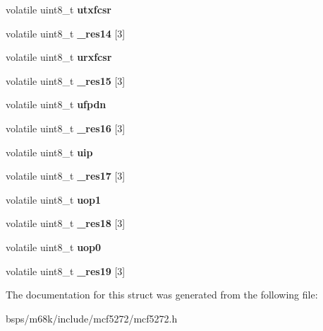 \begin{DoxyCompactItemize}
\item 
\mbox{\label{structuart__regs__t_a2d2aef760cfd8841151ebfd427f05e12}} 
volatile uint8\+\_\+t {\bfseries utxfcsr}
\item 
\mbox{\label{structuart__regs__t_a8f1a6281292c8860c2d577bcb0102aa6}} 
volatile uint8\+\_\+t {\bfseries \+\_\+res14} \mbox{[}3\mbox{]}
\item 
\mbox{\label{structuart__regs__t_a78f94dce8c79c4a4226facbc9e397433}} 
volatile uint8\+\_\+t {\bfseries urxfcsr}
\item 
\mbox{\label{structuart__regs__t_a585cb5a43e2e186bd1210509dd692c11}} 
volatile uint8\+\_\+t {\bfseries \+\_\+res15} \mbox{[}3\mbox{]}
\item 
\mbox{\label{structuart__regs__t_ac4e4f9f16a2a1e6cfee62406a12f8031}} 
volatile uint8\+\_\+t {\bfseries ufpdn}
\item 
\mbox{\label{structuart__regs__t_a58310b940ce1cabc62823fbb9017303a}} 
volatile uint8\+\_\+t {\bfseries \+\_\+res16} \mbox{[}3\mbox{]}
\item 
\mbox{\label{structuart__regs__t_aec0159917f54af4ef9bd6eee0dc3b241}} 
volatile uint8\+\_\+t {\bfseries uip}
\item 
\mbox{\label{structuart__regs__t_a1e5c3ce0c6c6c47032611f9df9477170}} 
volatile uint8\+\_\+t {\bfseries \+\_\+res17} \mbox{[}3\mbox{]}
\item 
\mbox{\label{structuart__regs__t_a8f7136f2cb5835e0c4393863a17711b4}} 
volatile uint8\+\_\+t {\bfseries uop1}
\item 
\mbox{\label{structuart__regs__t_a49eb275cfdf935ba5d780c6a18febce5}} 
volatile uint8\+\_\+t {\bfseries \+\_\+res18} \mbox{[}3\mbox{]}
\item 
\mbox{\label{structuart__regs__t_ae3dcbae753ba172b30e7de8879515bac}} 
volatile uint8\+\_\+t {\bfseries uop0}
\item 
\mbox{\label{structuart__regs__t_ad82eddb28345ccfb56fa54873289845d}} 
volatile uint8\+\_\+t {\bfseries \+\_\+res19} \mbox{[}3\mbox{]}
\end{DoxyCompactItemize}


The documentation for this struct was generated from the following file\+:\begin{DoxyCompactItemize}
\item 
bsps/m68k/include/mcf5272/mcf5272.\+h\end{DoxyCompactItemize}
